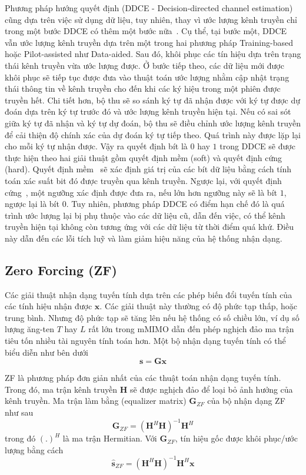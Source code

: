 Phương pháp hướng quyết định (DDCE - Decision-directed channel estimation) cũng dựa trên việc sử dụng dữ liệu, tuy nhiên, thay vì ước lượng kênh truyền chỉ trong một bước DDCE có thêm một bước nữa~\cite{vilas2022}. Cụ thể, tại bước một, DDCE vẫn ước lượng kênh truyền dựa trên một trong hai phương pháp Training-based hoặc Pilot-assisted như Data-aided. Sau đó, khôi phục các tín hiệu dựa trên trạng thái kênh truyền vừa ước lượng được. Ở bước tiếp theo, các dữ liệu mới được khôi phục sẽ tiếp tục được đưa vào thuật toán ước lượng nhằm cập nhật trạng thái thông tin về kênh truyền cho đến khi các ký hiệu trong một phiên được truyền hết. Chi tiết hơn, bộ thu sẽ so sánh ký tự đã nhận được với ký tự được dự đoán dựa trên ký tự trước đó và ước lượng kênh truyền hiện tại. Nếu có sai sót giữa ký tự đã nhận và ký tự dự đoán, bộ thu sẽ điều chỉnh ước lượng kênh truyền để cải thiện độ chính xác của dự đoán ký tự tiếp theo. Quá trình này được lặp lại cho mỗi ký tự nhận được. Vậy ra quyết định bít là $0$ hay $1$ trong DDCE sẽ được thực hiện theo hai giải thuật gồm quyết định mềm (soft) và quyết định cứng (hard). Quyết định mềm~\cite{Park2015} sẽ xác định giá trị của các bít dữ liệu bằng cách tính toán xác suất bit đó được truyền qua kênh truyền. Ngược lại, với quyết định cứng~\cite{Kai2005}, một ngưỡng xác định được đưa ra, nếu lớn hơn ngưỡng này sẽ là bít $1$, ngược lại là bít $0$. Tuy nhiên, phương pháp DDCE có điểm hạn chế đó là quá trình ước lượng lại bị phụ thuộc vào các dữ liệu cũ, dẫn đến việc, có thể kênh truyền hiện tại không còn tương ứng với các dữ liệu từ thời điểm quá khứ. Điều này dẫn đến các lỗi tích luỹ và làm giảm hiệu năng của hệ thống nhận dạng.

\subsection{Zero Forcing (ZF)} \label{sec:zf}

Các giải thuật nhận dạng tuyến tính dựa trên các phép biến đổi tuyến tính của các tính hiệu nhận được $\mathbf{x}$. Các giải thuật này thường có độ phức tạp thấp, hoặc trung bình. Nhưng độ phức tạp sẽ tăng lên nếu hệ thống có số chiều lớn, ví dụ số lượng ăng-ten $T$ hay $L$ rất lớn trong mMIMO dẫn đến phép nghịch đảo ma trận tiêu tốn nhiều tài nguyên tính toán hơn. Một bộ nhận dạng tuyến tính có thể biểu diễn như bên dưới
\begin{equation}
    \mathbf{s} = \mathbf{G} \mathbf{x}
\end{equation}

ZF là phương pháp đơn giản nhất của các thuật toán nhận dạng tuyến tính. Trong đó, ma trận kênh truyền $\mathbf{H}$ sẽ được nghịch đảo để loại bỏ ảnh hưởng của kênh truyền. Ma trận làm bằng (equalizer matrix) $\mathbf{G}_{ZF}$ của bộ nhận dạng ZF như sau
\begin{equation}
    \mathbf{G}_{ZF}=\left(\mathbf{H}^H \mathbf{H}\right)^{-1} \mathbf{H}^H
\end{equation}
trong đó $(.)^H$ là ma trận Hermitian. Với $\mathbf{G}_{ZF}$, tín hiệu gốc được khôi phục/ước lượng bằng cách
\begin{equation}
    \hat{\mathbf{s}}_{ZF}=\left(\mathbf{H}^H \mathbf{H}\right)^{-1} \mathbf{H}^H \mathbf{x}
\end{equation}

